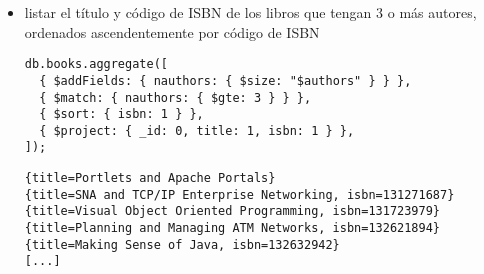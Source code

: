 \documentclass[12pt, a4paper]{article}
\begin{document}
\begin{itemize}
\begin{lstlisting}[frame=shadowbox]
{_id=Web Development}
{_id=Software Engineering}
{_id=Programming}
\end{lstlisting}

\item listar el título y código de ISBN de los libros que tengan 3 o más autores, ordenados ascendentemente por código de ISBN
\begin{lstlisting}[frame=single]
db.books.aggregate([
  { $addFields: { nauthors: { $size: "$authors" } } },
  { $match: { nauthors: { $gte: 3 } } },
  { $sort: { isbn: 1 } },
  { $project: { _id: 0, title: 1, isbn: 1 } },
]);
\end{lstlisting}

\begin{lstlisting}[frame=shadowbox]
{title=Portlets and Apache Portals}
{title=SNA and TCP/IP Enterprise Networking, isbn=131271687}
{title=Visual Object Oriented Programming, isbn=131723979}
{title=Planning and Managing ATM Networks, isbn=132621894}
{title=Making Sense of Java, isbn=132632942}
[...]
\end{lstlisting}

\end{itemize}
\end{document}
